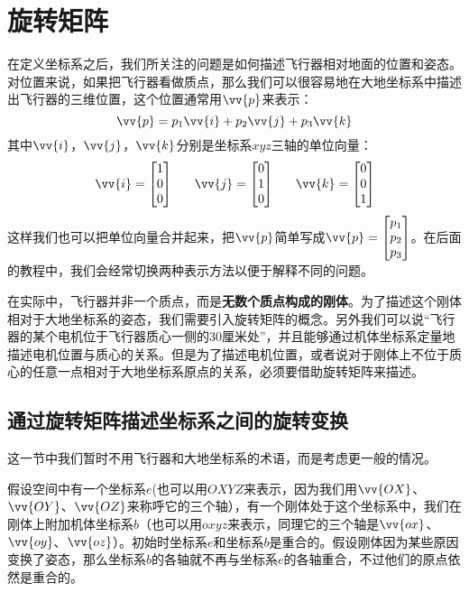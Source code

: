 \documentclass[11pt]{article}
\begin{document}
\section{旋转矩阵}\label{sec:rotmtx}
在定义坐标系之后，我们所关注的问题是如何描述飞行器相对地面的位置和姿态。对位置来说，如果把飞行器看做质点，那么我们可以很容易地在大地坐标系中描述出飞行器的三维位置，这个位置通常用$\vv{p}$来表示：
$$
\vv{p} = p_1\vv{i}+p_2\vv{j}+p_3\vv{k}
$$
其中$\vv{i}$，$\vv{j}$，$\vv{k}$分别是坐标系$xyz$三轴的单位向量：
$$
\vv{i} = \begin{bmatrix}
1\\0\\0
\end{bmatrix}\ \ \ \ \ 
\vv{j} = \begin{bmatrix}
0\\1\\0
\end{bmatrix}\ \ \ \ \ 
\vv{k} = \begin{bmatrix}
0\\0\\1
\end{bmatrix}
$$
这样我们也可以把单位向量合并起来，把$\vv{p}$简单写成$\vv{p} = \begin{bmatrix}
p_1\\p_2\\p_3
\end{bmatrix}$。在后面的教程中，我们会经常切换两种表示方法以便于解释不同的问题。

在实际中，飞行器并非一个质点，而是\textbf{无数个质点构成的刚体}。为了描述这个刚体相对于大地坐标系的姿态，我们需要引入旋转矩阵的概念。另外我们可以说“飞行器的某个电机位于飞行器质心一侧的30厘米处”，并且能够通过机体坐标系定量地描述电机位置与质心的关系。但是为了描述电机位置，或者说对于刚体上不位于质心的任意一点相对于大地坐标系原点的关系，必须要借助旋转矩阵来描述。
\subsection{通过旋转矩阵描述坐标系之间的旋转变换}\label{sec:rotationmtxdefinition}
这一节中我们暂时不用飞行器和大地坐标系的术语，而是考虑更一般的情况。

假设空间中有一个坐标系$e$(也可以用$OXYZ$来表示，因为我们用$\vv{OX}$、$\vv{OY}$、$\vv{OZ}$来称呼它的三个轴），有一个刚体处于这个坐标系中，我们在刚体上附加机体坐标系$b$（也可以用$oxyz$来表示，同理它的三个轴是$\vv{ox}$、$\vv{oy}$、$\vv{oz}$）。初始时坐标系$e$和坐标系$b$是重合的。假设刚体因为某些原因变换了姿态，那么坐标系$b$的各轴就不再与坐标系$e$的各轴重合，不过他们的原点依然是重合的。
\end{document}
